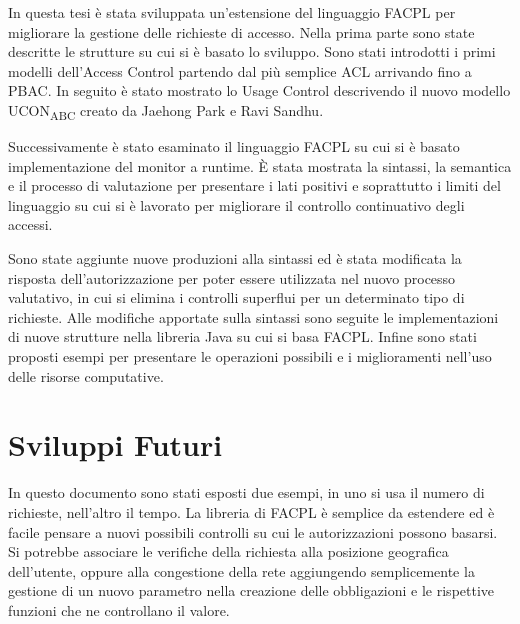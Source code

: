 \label{chap:Conclusioni}
In questa tesi è stata sviluppata un'estensione del linguaggio \ac{FACPL} per migliorare la gestione delle richieste di accesso.
Nella prima parte sono state descritte le strutture su cui si è basato lo sviluppo. Sono stati introdotti i primi modelli
dell'Access Control partendo dal più semplice \ac{ACL} arrivando fino a \ac{PBAC}. In seguito è stato mostrato lo Usage Control
descrivendo il nuovo modello UCON\textsubscript{ABC} creato da Jaehong Park e Ravi Sandhu.

Successivamente è stato esaminato il linguaggio \ac{FACPL} su cui si è basato implementazione del monitor a runtime.
\MakeUppercase{è} stata mostrata la sintassi, la semantica e il processo di valutazione per presentare i lati positivi
e soprattutto i limiti del linguaggio su cui si è lavorato per migliorare il controllo continuativo degli accessi.

Sono state aggiunte nuove produzioni alla sintassi ed è stata modificata la risposta dell'autorizzazione per poter
essere utilizzata nel nuovo processo valutativo, in cui si elimina i controlli superflui per un determinato tipo di richieste.
Alle modifiche apportate sulla sintassi sono seguite le implementazioni di nuove strutture nella libreria Java su cui si
basa \ac{FACPL}. Infine sono stati proposti esempi per presentare le operazioni possibili e i miglioramenti nell'uso delle
risorse computative.

\section{Sviluppi Futuri}
\label{sec:Sviluppi Futuri}
In questo documento sono stati esposti due esempi, in uno si usa il numero di richieste, nell'altro il tempo.
La libreria di \ac{FACPL} è semplice da estendere ed è facile pensare a nuovi possibili controlli su cui
le autorizzazioni possono basarsi. Si potrebbe associare le verifiche della richiesta alla posizione
geografica dell'utente, oppure alla congestione della rete aggiungendo semplicemente la gestione di un nuovo parametro nella
creazione delle obbligazioni e le rispettive funzioni che ne controllano il valore.
